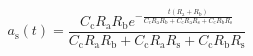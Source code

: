 \begin{equation}
a_{\mathrm{s}}{\left(t \right)} = \frac{C_{\mathrm{c}} R_{\mathrm{a}} R_{\mathrm{b}} e^{- \frac{t \left(R_{\mathrm{a}} + R_{\mathrm{b}}\right)}{C_{\mathrm{c}} R_{\mathrm{a}} R_{\mathrm{b}} + C_{\mathrm{c}} R_{\mathrm{a}} R_{\mathrm{s}} + C_{\mathrm{c}} R_{\mathrm{b}} R_{\mathrm{s}}}}}{C_{\mathrm{c}} R_{\mathrm{a}} R_{\mathrm{b}} + C_{\mathrm{c}} R_{\mathrm{a}} R_{\mathrm{s}} + C_{\mathrm{c}} R_{\mathrm{b}} R_{\mathrm{s}}}
\end{equation}

